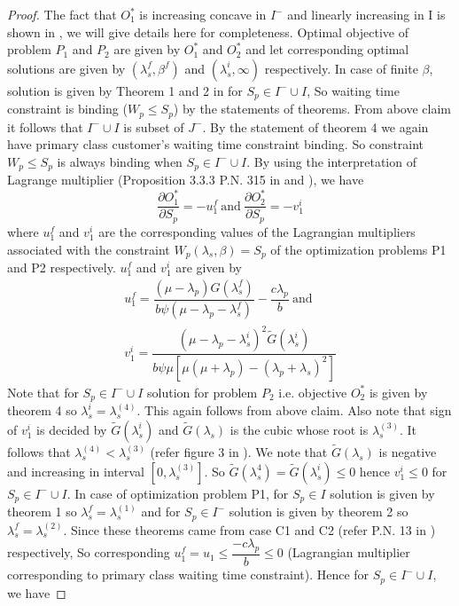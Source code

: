 \documentclass[12pt, a4paper]{report}
\begin{document}
\begin{proof}
 The fact that $O_1^*$ is increasing concave in $I^-$ and linearly increasing in I is shown in \cite{Sudhir_standard_style}, we will give details here for completeness. Optimal objective of problem $P_1$ and $P_2$ are given by $O_{1}^{*}$ and $O_{2}^{*}$ and let corresponding optimal solutions are given by $(\lambda_s^f,\beta^f)$ and $(\lambda_s^i,\infty)$ respectively. In case of finite $\beta$, solution is given by Theorem 1 and 2 in \cite{Sudhir_standard_style} for $S_p \in I^-\cup I$, So waiting time constraint is binding ($W_p \leq S_p$) by the statements of theorems. From above claim it follows that  $I^-\cup I$ is subset of $J^-$. By the statement of theorem 4 we again have primary class customer's waiting time constraint binding. So constraint $W_p \leq S_p$ is always binding when $S_p \in I^- \cup I$. By using the interpretation of Lagrange multiplier (Proposition 3.3.3 P.N. 315 in \cite{bertsekas} and \cite{Sudhir_standard_style}), we have
\begin{equation}\label{eqn:22}
\dfrac{\partial O_1^*}{\partial S_p} = -u_1^f~\text{and}~\dfrac{\partial O_2^*}{\partial S_p} = -v_1^i 
\end{equation}
where $u_1^f$ and $v_1^i$ are the corresponding values of the Lagrangian multipliers associated
with the constraint $W_p(\lambda_s,\beta) = S_p$ of the optimization problems P1 and P2 respectively. $u_1^f$ and $v_1^i$ are given by \cite{Sudhir_standard_style}
\begin{eqnarray}\label{eqn:23}
u_1^f = \dfrac{(\mu-\lambda_p)G(\lambda_s^f)}{b\psi(\mu-\lambda_p-\lambda_s^f)}-\dfrac{c\lambda_p}{b}~\text{and}\\ v_1^i = \dfrac{(\mu-\lambda_p-\lambda_s^i)^2\tilde{G}(\lambda_s^i)}{b\psi\mu[\mu(\mu+\lambda_p)-(\lambda_p+\lambda_s)^2]}
\end{eqnarray}
Note that for $S_p \in I^-\cup I$ solution for problem $P_2$ i.e. objective $O_2^*$ is given by theorem 4 so $\lambda_s^i = \lambda_s^{(4)}$. This again follows from above claim. Also note that sign of $v_1^i$ is decided by $\tilde{G}(\lambda_s^i)$ and $\tilde{G}(\lambda_s)$ is the cubic whose root is $\lambda_s^{(3)}$. It follows that $\lambda_s^{(4)} < \lambda_s^{(3)}$ (refer figure 3 in \cite{Sudhir_standard_style}). We note that $\tilde{G}(\lambda_s)$ is negative and increasing in interval $[0,\lambda_s^{(3)}]$. So $\tilde{G}(\lambda_s^4) =\tilde{G}(\lambda_s^i)\leq0$ hence $v_1^i\leq 0$ for $S_p \in I^-\cup I $. In case of optimization problem P1, for $S_p \in I$ solution is given by theorem 1 so $\lambda_s^f = \lambda_s^{(1)}$ and for $S_p \in I^-$ solution is given by theorem 2 so $\lambda_s^f = \lambda_s^{(2)}$. Since these theorems came from case C1 and C2 (refer P.N. 13 in \cite{Sudhir_standard_style}) respectively, So corresponding $u_1^f = u_1 \leq \dfrac{-c\lambda_p}{b} \leq 0$ (Lagrangian multiplier corresponding to primary class waiting time constraint). Hence for $S_p \in I^-\cup I$, we have 

\end{proof}
\end{document}
